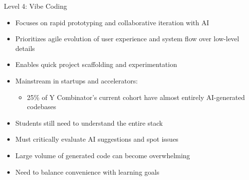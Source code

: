 \documentclass[xcolor=dvipsnames, aspectratio=169]{beamer}
\begin{document}
\begin{frame}{Level 4: Vibe Coding}
  \begin{tcolorbox}[colback=green!10!white, colframe=green!60!black, title=Vibe Coding]
    \begin{itemize}
      \item Focuses on rapid prototyping and collaborative iteration with AI
      \item Prioritizes agile evolution of user experience and system flow over low-level details
      \item Enables quick project scaffolding and experimentation
      \item Mainstream in startups and accelerators:
        \begin{itemize}\footnotesize
          \item 25\% of Y Combinator's current cohort have almost entirely AI-generated codebases
        \end{itemize}
    \end{itemize}
  \end{tcolorbox}
  \begin{tcolorbox}[colback=red!10!white, colframe=red!60!black, title=Challenges]
    \begin{itemize}
      \item Students still need to understand the entire stack
      \item Must critically evaluate AI suggestions and spot issues
      \item Large volume of generated code can become overwhelming
      \item Need to balance convenience with learning goals
    \end{itemize}
  \end{tcolorbox}
\end{frame}
\end{document}
